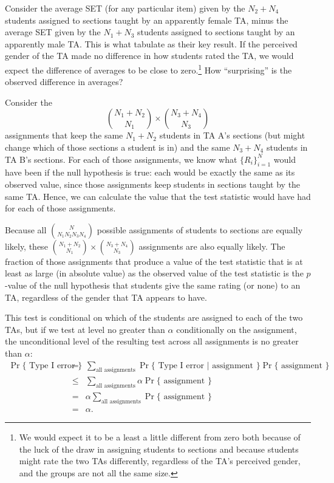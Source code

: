 \documentclass[12pt]{article}
\newcommand{\beq}{\begin{equation}}
\newcommand{\eeq}{\end{equation}}
\begin{document}
Consider the average SET (for any particular item)
given by the $N_2 + N_4$ students
assigned to sections taught by an apparently female TA, minus the 
average SET given by the $N_1 + N_3$ students
assigned to sections taught by an apparently male TA.
This is what \cite{MacNell2014} tabulate as their key result.
If the perceived gender of the TA made no difference in how students rated 
the TA, we would expect the difference of averages to be close to
zero.\footnote{%
We would expect it to be a least a little different from zero both because of the luck of the draw
in assigning students to sections and because students might rate the two TAs
differently, regardless of the TA's perceived gender, and the groups are not all the same size.
}
How ``surprising'' is the observed difference in averages?

Consider the
\beq
{{N_1 + N_2} \choose {N_1}} \times {{N_3+N_4} \choose {N_3}}
\eeq
assignments that keep the same $N_1 + N_2$ students in TA A's
sections (but might change which of those sections a student is in) 
and the same $N_3 + N_4$ students in TA B's sections.
For each of those assignments, we know what $\{R_i\}_{i=1}^N$ would
have been if the null hypothesis is true: each would be exactly the same
as its observed value, since those
assignments keep students in sections taught by the same TA.
Hence, we can calculate the value that the test statistic would have had for each
of those assignments.

Because all ${N}\choose{N_1 N_2 N_3 N_4}$ possible assignments of students
to sections are equally likely, these 
${{N_1 + N_2} \choose {N_1}} \times {{N_3+N_4} \choose {N_3}}$ 
assignments are also equally likely.
The fraction of those assignments that produce a value of the test statistic that
is at least as large (in absolute value) as the observed value of the test statistic
is the $p$-value of the null hypothesis that students give the same rating (or none) to
an TA, regardless of the gender that TA appears to have.

This test is conditional on which of the students are assigned to each of the two 
TAs, but if we test at level no greater than $\alpha$ conditionally on the
assignment, the unconditional level of the resulting test across all assignments is no 
greater than $\alpha$:
\begin{eqnarray}
   \Pr \{ \mbox{ Type I error } \} &=& \sum_{\mbox{all assignments}} \Pr \{ \mbox{ Type I error } | 
   \mbox{ assignment } \} \Pr\{\mbox{ assignment } \} \nonumber \\
   &\le& 
    \sum_{\mbox{all assignments}} \alpha \Pr\{\mbox{ assignment } \} \nonumber \\
    &=& \alpha \sum_{\mbox{all assignments}} \Pr\{\mbox{ assignment } \} \nonumber \\
    &=& \alpha.
\end{eqnarray}
\end{document}

